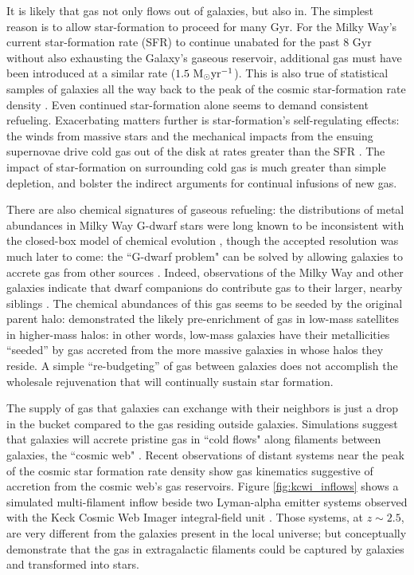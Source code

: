 It is likely that gas not only flows out of galaxies, but also in. The simplest reason is to allow star-formation to proceed for many Gyr. For the Milky Way's current star-formation rate (SFR) to continue unabated for the past 8 Gyr without also exhausting the Galaxy's gaseous reservoir, additional gas must have been introduced at a similar rate ($1.5 ~ {\rm M_{\odot} yr^{-1}}$). This is also true of statistical samples of galaxies all the way back to the peak of the cosmic star-formation rate density \citep{tacconi_2013}. Even continued star-formation alone seems to demand consistent refueling. Exacerbating matters further is star-formation's self-regulating effects: the winds from massive stars and the mechanical impacts from the ensuing supernovae drive cold gas out of the disk at rates greater than the SFR \citep{chisholm_18_outflows, roberts-borsani_20_outflows}. The impact of star-formation on surrounding cold gas is much greater than simple depletion, and bolster the indirect arguments for continual infusions of new gas.

There are also chemical signatures of gaseous refueling: the distributions of metal abundances in Milky Way G-dwarf stars were long known to be inconsistent with the closed-box model of chemical evolution \citep{vandenbergh_62_gdwarf}, though the accepted resolution was much later to come: the ``G-dwarf problem" can be solved by allowing galaxies to accrete gas from other sources \citep{fraternali_07}. Indeed, observations of the Milky Way and other galaxies indicate that dwarf companions do contribute gas to their larger, nearby siblings \citep{martinez-delgado_2010}. The chemical abundances of this gas seems to be seeded by the original parent halo: \citet{schaefer_19_accretion} demonstrated the likely pre-enrichment of gas in low-mass satellites in higher-mass halos: in other words, low-mass galaxies have their metallicities ``seeded'' by gas accreted from the more massive galaxies in whose halos they reside. A simple ``re-budgeting'' of gas between galaxies does not accomplish the wholesale rejuvenation that will continually sustain star formation.

The supply of gas that galaxies can exchange with their neighbors is just a drop in the bucket compared to the gas residing outside galaxies. Simulations suggest that galaxies will accrete pristine gas in ``cold flows" along filaments between galaxies, the ``cosmic web" \citep{silk_mamon_2012,sancisi08,cresci_2010_accretion}. Recent observations of distant systems near the peak of the cosmic star formation rate density show gas kinematics suggestive of accretion from the cosmic web's gas reservoirs. Figure \ref{fig:kcwi_inflows} shows a simulated multi-filament inflow beside two Lyman-alpha emitter systems observed with the Keck Cosmic Web Imager integral-field unit \citep{martin_19_kcwi-inflows}. Those systems, at $z \sim 2.5$, are very different from the galaxies present in the local universe; but conceptually demonstrate that the gas in extragalactic filaments could be captured by galaxies and transformed into stars.

